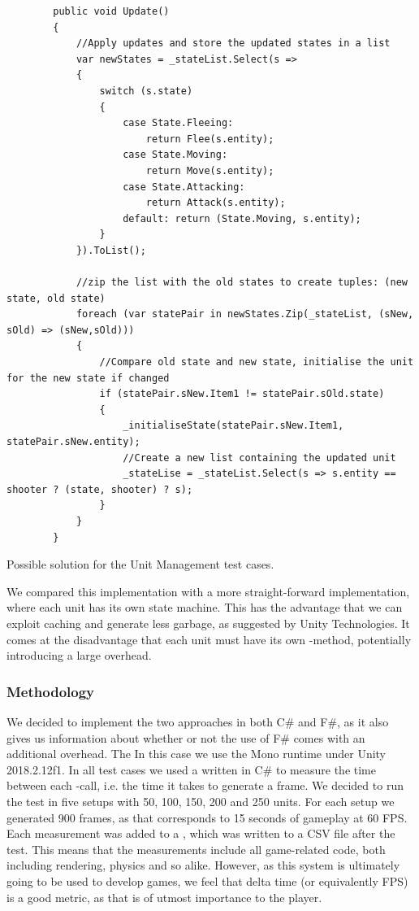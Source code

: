 \begin{listing}
    \begin{verbatim}
        public void Update()
        {
            //Apply updates and store the updated states in a list
            var newStates = _stateList.Select(s =>
            {
                switch (s.state)
                {
                    case State.Fleeing:
                        return Flee(s.entity);
                    case State.Moving:
                        return Move(s.entity);
                    case State.Attacking:
                        return Attack(s.entity);
                    default: return (State.Moving, s.entity);
                }
            }).ToList();

            //zip the list with the old states to create tuples: (new state, old state)
            foreach (var statePair in newStates.Zip(_stateList, (sNew, sOld) => (sNew,sOld)))
            {
                //Compare old state and new state, initialise the unit for the new state if changed
                if (statePair.sNew.Item1 != statePair.sOld.state)
                {
                    _initialiseState(statePair.sNew.Item1, statePair.sNew.entity);
                    //Create a new list containing the updated unit
                    _stateLise = _stateList.Select(s => s.entity == shooter ? (state, shooter) ? s);
                }
            }
        }
    \end{verbatim}
    \caption{Possible solution for the Unit Management test cases.}
    \label{lst:test:case:ai}
\end{listing}

We compared this implementation with a more straight-forward implementation, where each unit has its own state machine. This has the advantage that we can exploit caching and generate less garbage, as suggested by Unity Technologies\cite{unity:optimisation}. It comes at the disadvantage that each unit must have its own -method, potentially introducing a large overhead\cite{unity:runtime:calls}.

\subsubsection{Methodology}
We decided to implement the two approaches in both C\# and F\#, as it also gives us information about whether or not the use of F\# comes with an additional overhead. The  In this case we use the Mono runtime under Unity 2018.2.12f1. In all test cases we used a  written in C\# to measure the time between each -call, i.e. the time it takes to generate a frame. We decided to run the test in five setups with 50, 100, 150, 200 and 250 units. For each setup we generated 900 frames, as that corresponds to 15 seconds of gameplay at 60 \gls{FPS}. Each measurement was added to a , which was written to a CSV file after the test. This means that the measurements include all game-related code, both including rendering, physics and so alike. However, as this system is ultimately going to be used to develop games, we feel that delta time (or equivalently \gls{FPS}) is a good metric, as that is of utmost importance to the player.

